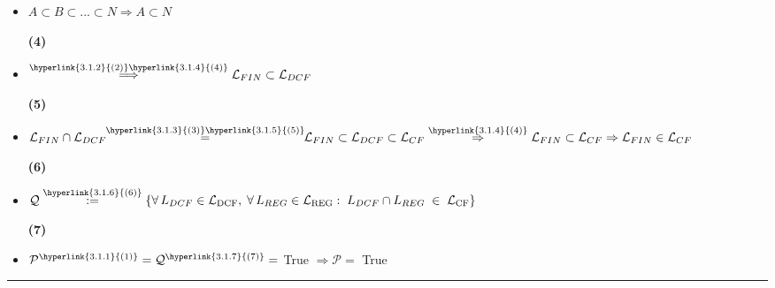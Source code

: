 \begin{tcolorbox}[colback=yellow!15!white, colframe=blue!50!white,
	fonttitle=\bfseries\Large, title = Απόδειξη]
\begin{itemize}
	\item $A \subset B \subset...\subset N \Rightarrow A \subset N$
	\reducevspace\reducevspace\reducevspace\reducevspace\reducevspace\reducevspace\reducevspace
	\reducevspace\reducevspace\reducevspace\reducevspace\reducevspace\reducevspace\reducevspace
	\reducevspace\reducevspace\reducevspace\reducevspace\reducevspace\reducevspace\reducevspace
	\begin{flushright}\hypertarget{3.1.4}{\bf{(4)}}\end{flushright}

	\item $\overset{\hyperlink{3.1.2}{(2)} \hyperlink{3.1.4}{(4)}}{\Longrightarrow} \mathcal{L}_{FIN} \subset
	\mathcal{L}_{DCF}$
	\reducevspace\reducevspace\reducevspace\reducevspace\reducevspace\reducevspace\reducevspace
	\reducevspace\reducevspace\reducevspace\reducevspace\reducevspace\reducevspace\reducevspace
	\reducevspace\reducevspace\reducevspace\reducevspace\reducevspace\reducevspace\reducevspace
	\begin{flushright}\hypertarget{3.1.5}{\bf{(5)}}\end{flushright}

	\item $\mathcal{L}_{FIN} \cap \mathcal{L}_{DCF}\!\!\overset{\hyperlink{3.1.3}{(3)}\hyperlink{3.1.5}{(5)}}{=}\!\!
	\mathcal{L}_{FIN} \subset \mathcal{L}_{DCF} \subset \mathcal{L}_{CF}
	\overset{\hyperlink{3.1.4}{(4)}}{\Rightarrow} \mathcal{L}_{FIN} \subset \mathcal{L}_{CF} \Rightarrow
	\mathcal{L}_{FIN} \in \mathcal{L}_{CF}$
	\reducevspace\reducevspace\reducevspace\reducevspace\reducevspace\reducevspace\reducevspace
	\reducevspace\reducevspace\reducevspace\reducevspace\reducevspace\reducevspace\reducevspace
	\reducevspace\reducevspace\reducevspace\reducevspace\reducevspace\reducevspace\reducevspace
	\begin{flushright}\hypertarget{3.1.6}{\bf{(6)}}\end{flushright}

	\item $\mathcal{Q} \overset{\hyperlink{3.1.6}{(6)}}{:=} \{\forall\,L_{DCF}\in\mathcal
	L_{\mathrm{DCF}},\;\forall\,L_{REG}\in\mathcal
	L_{\mathrm{REG}}:\;L_{DCF}\cap L_{REG}\;\in\;\mathcal L_{\mathrm{CF}}\}$
	\reducevspace\reducevspace\reducevspace\reducevspace\reducevspace\reducevspace\reducevspace
	\reducevspace\reducevspace\reducevspace\reducevspace\reducevspace\reducevspace\reducevspace
	\reducevspace\reducevspace\reducevspace\reducevspace\reducevspace\reducevspace\reducevspace
	\begin{flushright}\hypertarget{3.1.7}{\bf{(7)}}\end{flushright}

	\item $\mathcal{P}^{\hyperlink{3.1.1}{(1)}} = \mathcal{Q}^{\hyperlink{3.1.7}{(7)}} = $ True $ \Rightarrow
	\mathcal{P} = $ True
\end{itemize}
\end{tcolorbox}

\begin{center}
	\noindent\rule{\linewidth}{0.5pt}
\end{center}
\clearpage